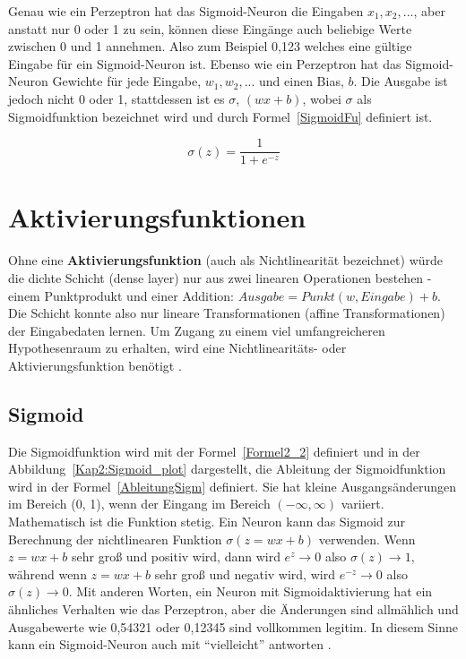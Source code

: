 Genau wie ein Perzeptron hat das Sigmoid-Neuron die Eingaben $x_1, x_2, ...$, aber anstatt nur 0 oder 1 zu sein, können diese Eingänge auch beliebige Werte zwischen 0 und 1 annehmen. Also zum Beispiel 0,123 welches eine gültige Eingabe für ein Sigmoid-Neuron ist. Ebenso wie ein Perzeptron hat das Sigmoid-Neuron Gewichte für jede Eingabe, $w_1, w_2, ...$ und einen Bias, $b$. Die Ausgabe ist jedoch nicht 0 oder 1, stattdessen ist es $\sigma$, $(wx + b)$, wobei $\sigma$ als Sigmoidfunktion bezeichnet wird und durch Formel~\ref{SigmoidFu} definiert ist.

\begin{equation} \label{SigmoidFu}
    \sigma (z) = \frac{1}{1+e^{-z}}
\end{equation}



\section{Aktivierungsfunktionen}
Ohne eine \textbf{Aktivierungsfunktion} (auch als Nichtlinearität bezeichnet) würde die dichte Schicht (dense layer) nur aus zwei linearen Operationen bestehen - einem Punktprodukt und einer Addition: $Ausgabe = Punkt (w, Eingabe) + b$. Die Schicht konnte also nur lineare Transformationen (affine Transformationen) der Eingabedaten lernen. Um Zugang zu einem viel umfangreicheren Hypothesenraum zu erhalten, wird eine Nichtlinearitäts- oder Aktivierungsfunktion benötigt \cite*[S. 72]{Chollet2017}.

\subsection{Sigmoid}
Die Sigmoidfunktion wird mit der Formel~\ref{Formel2_2} definiert und in der Abbildung~\ref{Kap2:Sigmoid_plot} dargestellt, die Ableitung der Sigmoidfunktion wird in der Formel~\ref{AbleitungSigm} definiert. Sie hat kleine Ausgangsänderungen im Bereich (0, 1), wenn der Eingang im Bereich $(-\infty, \infty)$ variiert. Mathematisch ist die Funktion stetig. Ein Neuron kann das Sigmoid zur Berechnung der nichtlinearen Funktion $\sigma(z = wx + b)$ verwenden. Wenn $z = wx + b$ sehr groß und positiv wird, dann wird $e^z \rightarrow 0$ also $\sigma(z) \rightarrow 1$, während wenn $z = wx + b$ sehr groß und negativ wird, wird $e^{-z} \rightarrow 0$ also $\sigma(z) \rightarrow 0$. Mit anderen Worten, ein Neuron mit Sigmoidaktivierung hat ein ähnliches Verhalten wie das Perzeptron, aber die Änderungen sind allmählich und Ausgabewerte wie 0,54321 oder 0,12345 sind vollkommen legitim. In diesem Sinne kann ein Sigmoid-Neuron auch mit \enquote{vielleicht} antworten \cite*[10]{AntonioGuili;AmitaKapoor;SujitPal2019}.


